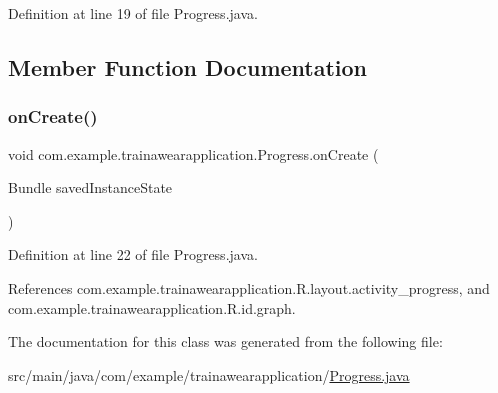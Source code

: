 Definition at line 19 of file Progress.\+java.



\subsection{Member Function Documentation}
\mbox{\label{classcom_1_1example_1_1trainawearapplication_1_1_progress_a839ad2f2cb526d70b32c517f54400f36}} 
\subsubsection{\texorpdfstring{onCreate()}{onCreate()}}
{\footnotesize\ttfamily void com.\+example.\+trainawearapplication.\+Progress.\+on\+Create (\begin{DoxyParamCaption}\item[{Bundle}]{saved\+Instance\+State }\end{DoxyParamCaption})\hspace{0.3cm}{\ttfamily [protected]}}



Definition at line 22 of file Progress.\+java.


\begin{DoxyCode}{0}

\end{DoxyCode}


References com.\+example.\+trainawearapplication.\+R.\+layout.\+activity\+\_\+progress, and com.\+example.\+trainawearapplication.\+R.\+id.\+graph.



The documentation for this class was generated from the following file\+:\begin{DoxyCompactItemize}
\item 
src/main/java/com/example/trainawearapplication/\mbox{\hyperlink{_progress_8java}{Progress.\+java}}\end{DoxyCompactItemize}
